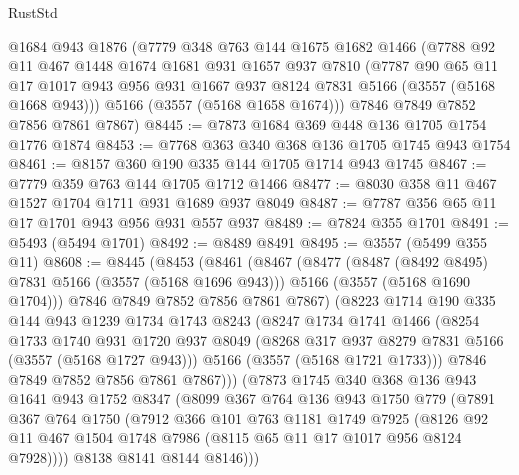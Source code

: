 \begin{lexlean}{RustStd}
\begin{coremodule}
    @1684
    @943
    @1876
    (@7779
      @348
      @763
      @144
      @1675
      @1682
      @1466
      (@7788
        @92
        @11
        @467
        @1448
        @1674
        @1681
        @931
        @1657
        @937
        @7810
        (@7787
          @90
          @65
          @11
          @17
          @1017
          @943
          @956
          @931
          @1667
          @937
          @8124
          @7831
          @5166
          (@3557 (@5168 @1668 @943)))
        @5166
        (@3557 (@5168 @1658 @1674)))
      @7846
      @7849
      @7852
      @7856
      @7861
      @7867)
@8445 := @7873 @1684 @369 @448 @136 @1705 @1754 @1776 @1874
@8453 := @7768 @363 @340 @368 @136 @1705 @1745 @943 @1754
@8461 := @8157 @360 @190 @335 @144 @1705 @1714 @943 @1745
@8467 := @7779 @359 @763 @144 @1705 @1712 @1466
@8477 := @8030 @358 @11 @467 @1527 @1704 @1711 @931 @1689 @937 @8049
@8487 := @7787 @356 @65 @11 @17 @1701 @943 @956 @931 @557 @937
@8489 := @7824 @355 @1701
@8491 := @5493 (@5494 @1701)
@8492 := @8489 @8491
@8495 := @3557 (@5499 @355 @11)
@8608 := @8445
    (@8453
      (@8461
        (@8467
          (@8477
            (@8487 (@8492 @8495) @7831 @5166 (@3557 (@5168 @1696 @943)))
            @5166
            (@3557 (@5168 @1690 @1704)))
          @7846
          @7849
          @7852
          @7856
          @7861
          @7867)
        (@8223
          @1714
          @190
          @335
          @144
          @943
          @1239
          @1734
          @1743
          @8243
          (@8247
            @1734
            @1741
            @1466
            (@8254
              @1733
              @1740
              @931
              @1720
              @937
              @8049
              (@8268 @317 @937 @8279 @7831 @5166 (@3557 (@5168 @1727 @943)))
              @5166
              (@3557 (@5168 @1721 @1733)))
            @7846
            @7849
            @7852
            @7856
            @7861
            @7867)))
      (@7873
        @1745
        @340
        @368
        @136
        @943
        @1641
        @943
        @1752
        @8347
        (@8099
          @367
          @764
          @136
          @943
          @1750
          @779
          (@7891
            @367
            @764
            @1750
            (@7912
              @366
              @101
              @763
              @1181
              @1749
              @7925
              (@8126 @92 @11 @467 @1504 @1748 @7986 (@8115 @65 @11 @17 @1017 @956 @8124 @7928))))
          @8138
          @8141
          @8144
          @8146)))

\end{coremodule}
\end{lexlean}
